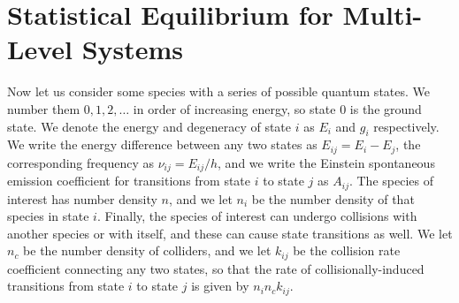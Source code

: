 \section{Statistical Equilibrium for Multi-Level Systems}

Now let us consider some species with a series of possible quantum states. We number them $0, 1, 2, \ldots$ in order of increasing energy, so state $0$ is the ground state. We denote the energy and degeneracy of state $i$ as $E_i$ and $g_i$ respectively. We write the energy difference between any two states as $E_{ij} = E_i - E_j$,  the corresponding frequency as $\nu_{ij} = E_{ij}/h$, and we write the Einstein spontaneous emission coefficient for transitions from state $i$ to state $j$ as $A_{ij}$. The species of interest has number density $n$, and we let $n_i$ be the number density of that species in state $i$. Finally, the species of interest can undergo collisions with another species or with itself, and these can cause state transitions as well. We let $n_c$ be the number density of colliders, and we let $k_{ij}$ be the collision rate coefficient connecting any two states, so that the rate of collisionally-induced transitions from state $i$ to state $j$ is given by $n_i n_c k_{ij}$.

